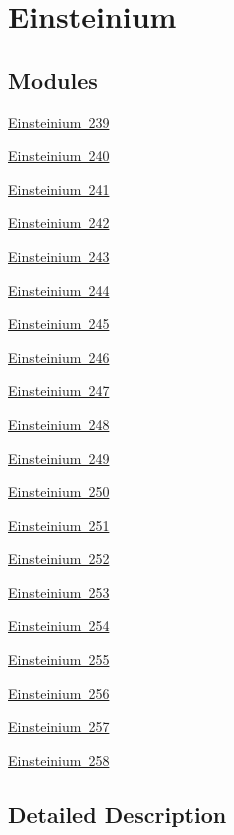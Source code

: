 \hypertarget{group___isotope_const-_einsteinium}{}\section{Einsteinium}
\label{group___isotope_const-_einsteinium}
\subsection*{Modules}
\begin{DoxyCompactItemize}
\item 
\mbox{\hyperlink{group___isotope_const-_einsteinium-_es239}{Einsteinium 239}}
\item 
\mbox{\hyperlink{group___isotope_const-_einsteinium-_es240}{Einsteinium 240}}
\item 
\mbox{\hyperlink{group___isotope_const-_einsteinium-_es241}{Einsteinium 241}}
\item 
\mbox{\hyperlink{group___isotope_const-_einsteinium-_es242}{Einsteinium 242}}
\item 
\mbox{\hyperlink{group___isotope_const-_einsteinium-_es243}{Einsteinium 243}}
\item 
\mbox{\hyperlink{group___isotope_const-_einsteinium-_es244}{Einsteinium 244}}
\item 
\mbox{\hyperlink{group___isotope_const-_einsteinium-_es245}{Einsteinium 245}}
\item 
\mbox{\hyperlink{group___isotope_const-_einsteinium-_es246}{Einsteinium 246}}
\item 
\mbox{\hyperlink{group___isotope_const-_einsteinium-_es247}{Einsteinium 247}}
\item 
\mbox{\hyperlink{group___isotope_const-_einsteinium-_es248}{Einsteinium 248}}
\item 
\mbox{\hyperlink{group___isotope_const-_einsteinium-_es249}{Einsteinium 249}}
\item 
\mbox{\hyperlink{group___isotope_const-_einsteinium-_es250}{Einsteinium 250}}
\item 
\mbox{\hyperlink{group___isotope_const-_einsteinium-_es251}{Einsteinium 251}}
\item 
\mbox{\hyperlink{group___isotope_const-_einsteinium-_es252}{Einsteinium 252}}
\item 
\mbox{\hyperlink{group___isotope_const-_einsteinium-_es253}{Einsteinium 253}}
\item 
\mbox{\hyperlink{group___isotope_const-_einsteinium-_es254}{Einsteinium 254}}
\item 
\mbox{\hyperlink{group___isotope_const-_einsteinium-_es255}{Einsteinium 255}}
\item 
\mbox{\hyperlink{group___isotope_const-_einsteinium-_es256}{Einsteinium 256}}
\item 
\mbox{\hyperlink{group___isotope_const-_einsteinium-_es257}{Einsteinium 257}}
\item 
\mbox{\hyperlink{group___isotope_const-_einsteinium-_es258}{Einsteinium 258}}
\end{DoxyCompactItemize}


\subsection{Detailed Description}
